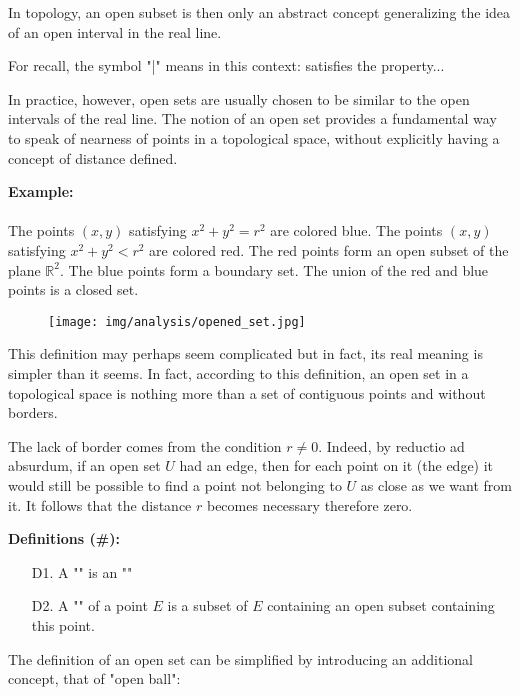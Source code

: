 	In topology, an open subset is then only an abstract concept generalizing the idea of an open interval in the real line.
	\begin{tcolorbox}[title=Remark,colframe=black,arc=10pt]
	For recall, the symbol "|" means in this context: satisfies the property...
	\end{tcolorbox}	
	In practice, however, open sets are usually chosen to be similar to the open intervals of the real line. The notion of an open set provides a fundamental way to speak of nearness of points in a topological space, without explicitly having a concept of distance defined. 
	\begin{tcolorbox}[colframe=black,colback=white,sharp corners]
	\textbf{{\Large {}}Example:}\\\\
	The points $(x, y)$ satisfying $x^2 + y^2 = r^2$ are colored blue. The points $(x, y)$ satisfying $x^2 + y^2 < r^2$ are colored red. The red points form an open subset of the plane $\mathbb{R}^2$. The blue points form a boundary set. The union of the red and blue points is a closed set.
	\begin{figure}[H]
		\centering
		\texttt{[image: img/analysis/opened\_set.jpg]}
	\end{figure}
	\end{tcolorbox}
	This definition may perhaps seem complicated but in fact, its real meaning is simpler than it seems. In fact, according to this definition, an open set in a topological space is nothing more than a set of contiguous points and without borders.
	
	The lack of border comes from the condition $r\neq 0$. Indeed, by reductio ad absurdum, if an open set $U$ had an edge, then for each point on it (the edge) it would still be possible to find a point not belonging to $U$ as close as we want from it. It follows that the distance $r$ becomes necessary therefore zero.

	\textbf{Definitions (\#\mydef):} 
	\begin{enumerate}
		\item[D1.] A "" is an ""

		\item[D2.] A "" of a point $E$ is a subset of $E$ containing an open subset containing this point.
	\end{enumerate}
	The definition of an open set can be simplified by introducing an additional concept, that of "open ball":
	
